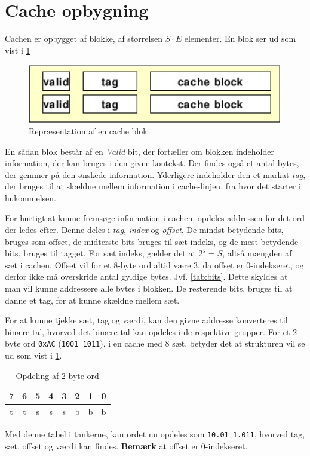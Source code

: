 \section{Cache opbygning}
Cachen er opbygget af blokke, af størrelsen $S\cdot E$ elementer. 
En blok ser ud som vist i \cref{fig:cacheblk}
\begin{figure}[h!]
    \centering
    \includegraphics[width=\textwidth]{figures/block.png}
    \caption{Repræsentation af en cache blok}
    \label{fig:cacheblk}
\end{figure}
En sådan blok består af en \textit{Valid} bit, der fortæller om blokken indeholder information, der kan bruges i den givne kontekst.
Der findes også et antal bytes, der gemmer på den ønskede information.
Yderligere indeholder den et markat \textit{tag}, der bruges til at skældne mellem information i cache-linjen, fra hvor det starter i hukommelsen.

For hurtigt at kunne fremsøge information i cachen, opdeles addressen for det ord der ledes efter.
Denne deles i \textit{tag}, \textit{index} og \textit{offset}.
De mindst betydende bits, bruges som offset, de midterste bits bruges til sæt indeks, og de mest betydende bits, bruges til tagget.
For sæt indeks, gælder det at $2^s=S$, altså mængden af sæt i cachen.
Offset vil for et 8-byte ord altid være 3, da offset er 0-indekseret, og derfor ikke må overskride antal gyldige bytes.
Jvf. \cref{tab:bits}.
Dette skyldes at man vil kunne addressere alle bytes i blokken.
De resterende bits, bruges til at danne et tag, for at kunne skældne mellem sæt.

For at kunne tjekke sæt, tag og værdi, kan den givne addresse konverteres til binære tal, hvorved det binære tal kan opdeles i de respektive grupper.
For et 2-byte ord \verb|0xAC| (\verb|1001 1011|), i en cache med 8 sæt, betyder det at strukturen vil se ud som vist i \cref{tab:2byteword}.
\begin{table}[h!]
    \centering
    \begin{tabular}{|c|c|c|c|c|c|c|c|}
        \hline
        7&6&5&4&3&2&1&0\\\hline
        t&t&s&s&s&b&b&b\\\hline
    \end{tabular}
    \caption{Opdeling af 2-byte ord}
    \label{tab:2byteword}
\end{table}
Med denne tabel i tankerne, kan ordet nu opdeles som \verb|10.01 1.011|, hvorved tag, sæt, offset og værdi kan findes.
\textbf{Bemærk} at offset er 0-indekseret.